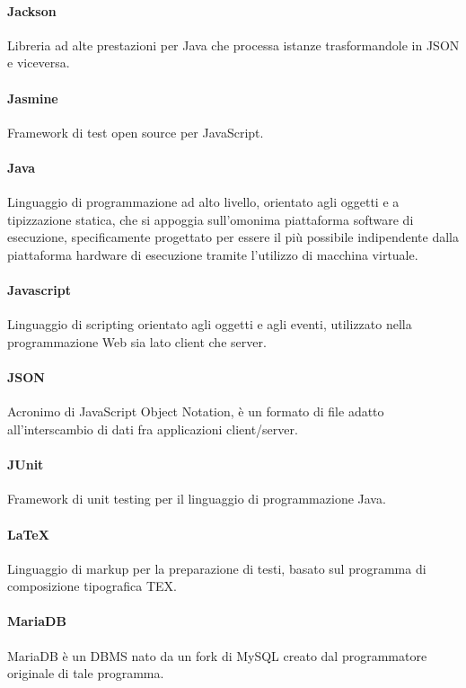 	\paragraph*{Jackson}
	Libreria ad alte prestazioni per Java che processa istanze trasformandole in JSON e viceversa.
	
	\paragraph*{Jasmine}
	Framework di test open source per JavaScript.
	
	\paragraph*{Java}
	Linguaggio di programmazione ad alto livello, orientato agli oggetti e a tipizzazione statica, che si appoggia sull'omonima piattaforma software di esecuzione, specificamente progettato per essere il più possibile indipendente dalla piattaforma hardware di esecuzione tramite l'utilizzo di macchina virtuale.
	
	\paragraph*{Javascript}
	Linguaggio di scripting orientato agli oggetti e agli eventi, utilizzato nella programmazione Web sia lato client che server.
	
	\paragraph*{JSON}
	Acronimo di JavaScript Object Notation, è un formato di file adatto all'interscambio di dati fra applicazioni client/server.
	
	\paragraph*{JUnit}
	Framework di unit testing per il linguaggio di programmazione Java.
	
	\paragraph*{LaTeX}
	Linguaggio di markup per la preparazione di testi, basato sul programma di composizione tipografica TEX.
	
	\paragraph*{MariaDB}
	MariaDB è un DBMS nato da un fork di MySQL creato dal programmatore originale di tale programma.
	
